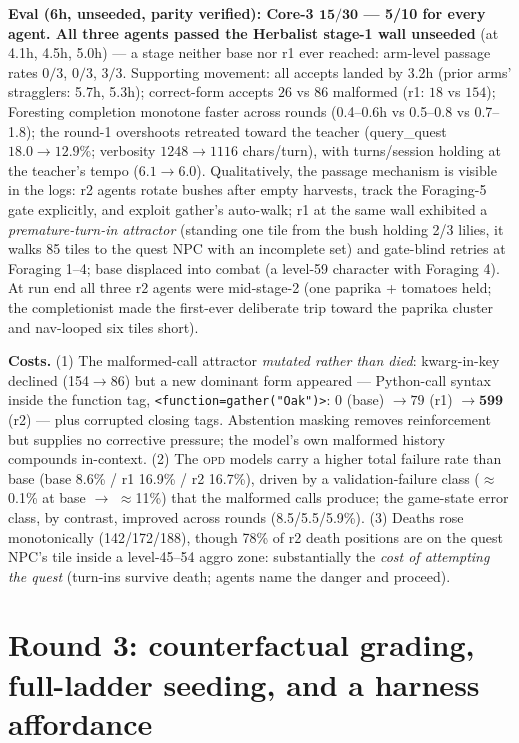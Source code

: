 \documentclass[11pt]{article}
\newcommand{\opd}{\textsc{opd}}
\begin{document}
\textbf{Eval (6h, unseeded, parity verified): Core-3 $\mathbf{15/30}$ --- 5/10 for every agent.
All three agents passed the Herbalist stage-1 wall unseeded} (at 4.1h, 4.5h, 5.0h) --- a stage
neither base nor r1 ever reached: arm-level passage rates $0/3$, $0/3$,
$3/3$. Supporting movement: all accepts landed by 3.2h (prior arms' stragglers: 5.7h, 5.3h);
correct-form accepts $26$ vs $86$ malformed (r1: $18$ vs $154$); Foresting completion monotone
faster across rounds (0.4--0.6h vs 0.5--0.8 vs 0.7--1.8); the round-1 overshoots retreated
toward the teacher (query\_quest $18.0\!\rightarrow\!12.9\%$; verbosity
$1248\!\rightarrow\!1116$ chars/turn), with turns/session holding at the teacher's tempo
($6.1\!\rightarrow\!6.0$). Qualitatively, the
passage mechanism is visible in the logs: r2 agents rotate bushes after empty harvests, track the
Foraging-5 gate explicitly, and exploit gather's auto-walk; r1 at the same wall exhibited a
\emph{premature-turn-in attractor} (standing one tile from the bush holding 2/3 lilies, it walks
85 tiles to the quest NPC with an incomplete set) and gate-blind retries at Foraging 1--4; base
displaced into combat (a level-59 character with Foraging 4). At run end all three r2 agents were
mid-stage-2 (one paprika + tomatoes held; the completionist made the first-ever deliberate trip
toward the paprika cluster and nav-looped six tiles short).

\textbf{Costs.} (1) The malformed-call attractor \emph{mutated rather than died}: kwarg-in-key
declined (154$\rightarrow$86) but a new dominant form appeared --- Python-call syntax inside the
function tag, \texttt{<function=gather("Oak")>}: $0$ (base) $\rightarrow 79$ (r1) $\rightarrow
\mathbf{599}$ (r2) --- plus corrupted closing tags. Abstention masking removes reinforcement but
supplies no corrective pressure; the model's own malformed history compounds in-context. (2) The
\opd{} models carry a higher total failure rate than base (base 8.6\% / r1 16.9\% / r2 16.7\%),
driven by a validation-failure class ($\approx$0.1\% at base $\rightarrow$ $\approx$11\%) that the
malformed calls produce; the game-state error class, by contrast, improved across rounds
(8.5/5.5/5.9\%). (3) Deaths rose monotonically (142/172/188), though 78\% of r2 death positions
are on the quest NPC's tile inside a level-45--54 aggro zone: substantially the \emph{cost of
attempting the quest} (turn-ins survive death; agents name the danger and proceed).

\section{Round 3: counterfactual grading, full-ladder seeding, and a harness affordance}
\label{sec:round3}
\end{document}
